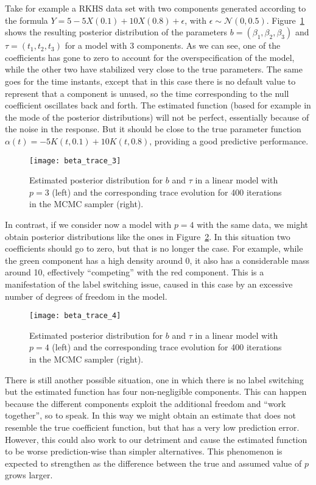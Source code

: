 Take for example a RKHS data set with two components generated according to the formula \(Y=5 -5X(0.1) + 10X(0.8) + \epsilon\), with \(\epsilon\sim \mathcal N(0, 0.5)\). Figure~\ref{fig:beta_trace_3} shows the resulting posterior distribution of the parameters \(b=(\beta_1, \beta_2, \beta_3)\) and \(\tau=(t_1, t_2, t_3)\) for a model with 3 components. As we can see, one of the coefficients has gone to zero to account for the overspecification of the model, while the other two have stabilized very close to the true parameters. The same goes for the time instants, except that in this case there is no default value to represent that a component is unused, so the time corresponding to the null coefficient oscillates back and forth. The estimated function (based for example in the mode of the posterior distributions) will not be perfect, essentially because of the noise in the response. But it should be close to the true parameter function \(\alpha(t)=-5K(t, 0.1) + 10K(t, 0.8)\), providing a good predictive performance.

\begin{figure}[ht!]
  \centering
  \texttt{[image: beta\_trace\_3]}
  \caption{Estimated posterior distribution for \(b\) and \(\tau\) in a linear model with \(p=3\) (left) and the corresponding trace evolution for 400 iterations in the MCMC sampler (right).}\label{fig:beta_trace_3}
\end{figure}

In contrast, if we consider now a model with \(p=4\) with the same data, we might obtain posterior distributions like the ones in Figure~\ref{fig:beta_trace_4}. In this situation two coefficients should go to zero, but that is no longer the case. For example, while the green component has a high density around 0, it also has a considerable mass around 10, effectively ``competing'' with the red component. This is a manifestation of the label switching issue, caused in this case by an excessive number of degrees of freedom in the model.

\begin{figure}[ht!]
  \centering
  \texttt{[image: beta\_trace\_4]}
  \caption{Estimated posterior distribution for \(b\) and \(\tau\) in a linear model with \(p=4\) (left) and the corresponding trace evolution for 400 iterations in the MCMC sampler (right).}\label{fig:beta_trace_4}
\end{figure}

There is still another possible situation, one in which there is no label switching but the estimated function has four non-negligible components. This can happen because the different components exploit the additional freedom and ``work together'', so to speak. In this way we might obtain an estimate that does not resemble the true coefficient function, but that has a very low prediction error. However, this could also work to our detriment and cause the estimated function to be worse prediction-wise than simpler alternatives. This phenomenon is expected to strengthen as the difference between the true and assumed value of \(p\) grows larger.

